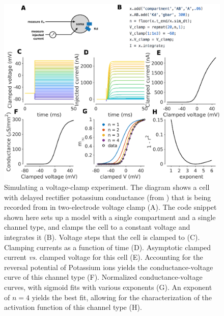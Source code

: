 \documentclass{frontiersSCNS} %
\begin{document}
\begin{figure}[!htb]
	\centering
	\includegraphics[width=1.0\linewidth]{gfx/figure_clamp}
	\caption{Simulating a voltage-clamp experiment. The diagram shows a cell with delayed rectifier potassium conductance (from \cite{liuModelNeuronActivityDependent1998}) that is being recorded from in two-electrode voltage clamp (A). The code snippet shown here sets up a model with a single compartment and a single channel type, and clamps the cell to a constant voltage and integrates it (B). Voltage steps that the cell is clamped to (C). Clamping currents as a function of time (D). Asymptotic clamped current {\em vs.} clamped voltage for this cell (E). Accounting for the reversal potential of Potassium ions yields the conductance-voltage curve of this channel type (F). Normalized conductance-voltage curves, with sigmoid fits with various exponents (G). An exponent of $n=4$ yields the best fit, allowing for the characterization of the activation function of this channel type (H). }
	\label{fig:figureclamp}
\end{figure}
\end{document}
